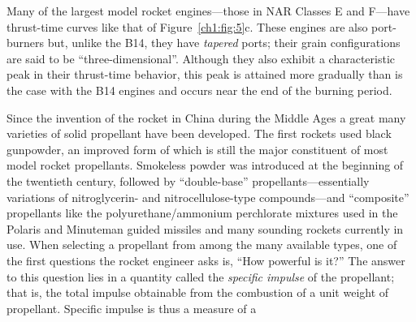 Many of the largest model rocket engines---those in NAR Classes E and F---have thrust-time
curves like that of Figure~\ref{ch1:fig:5}c. These engines are also port-burners but, unlike the
B14, they have \emph{tapered} ports; their grain configurations are said to be
``three-dimensional''. Although they also exhibit a characteristic peak in their thrust-time
behavior, this peak is attained more gradually than is the case with the B14 engines and occurs
near the end of the burning period.

Since the invention of the rocket in China during the Middle Ages a great many varieties of solid
propellant have been developed. The first rockets used black gunpowder, an improved form of which
is still the major constituent of most model rocket propellants. Smokeless powder was introduced
at the beginning of the twentieth century, followed by ``double-base'' propellants---essentially
variations of nitroglycerin- and nitrocellulose-type compounds---and ``composite'' propellants
like the polyurethane/ammonium perchlorate mixtures used in the Polaris and Minuteman guided
missiles and many sounding rockets currently in use. When selecting a propellant from among the
many available types, one of the first questions the rocket engineer asks is, ``How powerful is
it?'' The answer to this question lies in a quantity called the \emph{specific
impulse} of the propellant; that is, the total impulse obtainable from the combustion of a unit
weight of propellant. Specific impulse is thus a measure of a
